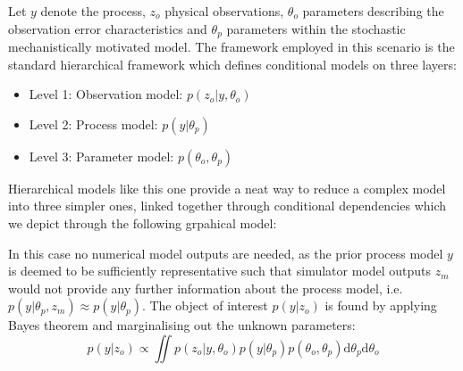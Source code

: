 \documentclass[10pt,a4paper]{article}
\newcommand{\intd} {\textrm{d}}
\begin{document}
Let $y$ denote the process, $z_o$ physical observations, $\theta_o$ parameters describing the observation error characteristics and $\theta_p$ parameters within the stochastic mechanistically motivated model. The framework employed in this scenario is the standard hierarchical framework \citep[e.g.][]{Cressie_2011} which defines conditional models on three layers:
\begin{itemize}
\item Level 1: Observation model: $p(z_o | y, \theta_o)$
\item Level 2: Process model: $p(y | \theta_p)$
\item Level 3: Parameter model: $p(\theta_o, \theta_p)$
\end{itemize}
\noindent Hierarchical models like this one provide a neat way to reduce a complex model into three simpler ones, linked together through conditional dependencies which we depict through the following grpahical model:

\begin{figure}[h!]
\centering
{}
\end{figure}

\noindent In this case no numerical model outputs are needed, as the prior process model $y$ is deemed to be sufficiently representative such that simulator model outputs $z_m$ would not provide any further information about the process model, i.e. $p(y | \theta_p,z_m) \approx p(y | \theta_p)$. The object of interest $p(y|z_o)$ is found by applying Bayes theorem and marginalising out the unknown parameters:
\begin{equation}
p(y|z_o) \propto \iint p(z_o | y, \theta_o)p(y | \theta_p)p(\theta_o, \theta_p) \intd \theta_p \intd\theta_o
\end{equation}
\end{document}
